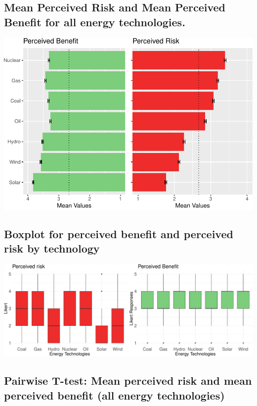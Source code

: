 \documentclass[
]{article}
\begin{document}
\newpage

\hypertarget{mean-perceived-risk-and-mean-perceived-benefit-for-all-energy-technologies.}{%
\subsection{Mean Perceived Risk and Mean Perceived Benefit for all
energy
technologies.}\label{mean-perceived-risk-and-mean-perceived-benefit-for-all-energy-technologies.}}

\includegraphics{Paper1_files/figure-latex/unnamed-chunk-7-1.pdf}

\hypertarget{boxplot-for-perceived-benefit-and-perceived-risk-by-technology}{%
\subsection{Boxplot for perceived benefit and perceived risk by
technology}\label{boxplot-for-perceived-benefit-and-perceived-risk-by-technology}}

\includegraphics{Paper1_files/figure-latex/unnamed-chunk-8-1.pdf}

\newpage

\hypertarget{pairwise-t-test-mean-perceived-risk-and-mean-perceived-benefit-all-energy-technologies}{%
\subsection{Pairwise T-test: Mean perceived risk and mean perceived
benefit (all energy
technologies)}\label{pairwise-t-test-mean-perceived-risk-and-mean-perceived-benefit-all-energy-technologies}}
\end{document}
